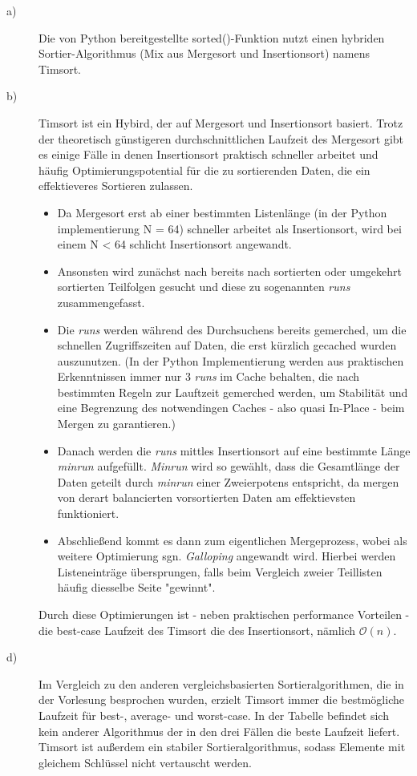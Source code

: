 \begin{description}
\item[a)] Die von Python bereitgestellte sorted()-Funktion nutzt einen hybriden Sortier-Algorithmus (Mix aus Mergesort und Insertionsort) namens Timsort.
\item[b)]
Timsort ist ein Hybird, der auf Mergesort und Insertionsort basiert. Trotz der theoretisch günstigeren durchschnittlichen Laufzeit des Mergesort gibt es einige Fälle in denen Insertionsort praktisch schneller arbeitet und häufig Optimierungspotential für die zu sortierenden Daten, die ein effektieveres Sortieren zulassen.
\begin{itemize}
\item Da Mergesort erst ab einer bestimmten Listenlänge (in der Python implementierung N = 64) schneller arbeitet als Insertionsort, wird bei einem N < 64 schlicht Insertionsort angewandt.
\item Ansonsten wird zunächst nach bereits nach sortierten oder umgekehrt sortierten Teilfolgen gesucht und diese zu sogenannten \textit{runs} zusammengefasst.
\item Die \textit{runs} werden während des Durchsuchens bereits gemerched, um die schnellen Zugriffszeiten auf Daten, die erst kürzlich gecached wurden auszunutzen. (In der Python Implementierung werden aus praktischen Erkenntnissen immer nur 3 \textit{runs} im Cache behalten, die nach bestimmten Regeln zur Lauftzeit gemerched werden, um Stabilität und eine Begrenzung des notwendingen Caches - also quasi In-Place - beim Mergen zu garantieren.)
\item Danach werden die \textit{runs} mittles Insertionsort auf eine bestimmte Länge \textit{minrun} aufgefüllt. \textit{Minrun} wird so gewählt, dass die Gesamtlänge der Daten geteilt durch \textit{minrun} einer Zweierpotens entspricht, da mergen von derart balancierten vorsortierten Daten am effektievsten funktioniert.
\item Abschließend kommt es dann zum eigentlichen Mergeprozess, wobei als weitere Optimierung sgn. \textit{Galloping} angewandt wird. Hierbei werden Listeneinträge übersprungen, falls beim Vergleich zweier Teillisten häufig diesselbe Seite "gewinnt".
\end{itemize}
Durch diese Optimierungen ist - neben praktischen performance Vorteilen - die best-case Laufzeit des Timsort die des Insertionsort, nämlich ${\mathcal O (n)}$. 
\item[d)]
Im Vergleich zu den anderen vergleichsbasierten Sortieralgorithmen, die in der Vorlesung besprochen wurden, erzielt Timsort immer die bestmögliche Laufzeit für best-, average- und worst-case. In der Tabelle befindet sich kein anderer Algorithmus der in den drei Fällen die beste Laufzeit liefert. Timsort ist außerdem ein stabiler Sortieralgorithmus, sodass Elemente mit gleichem Schlüssel nicht vertauscht werden. \\

\end{description}
